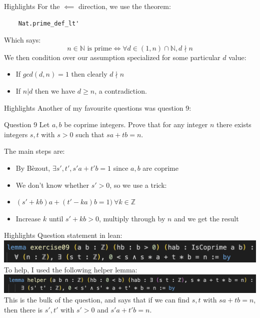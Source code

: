 \documentclass[presentation]{beamer}
\begin{document}
\begin{frame}[fragile]{Highlights}
    For the \(\impliedby\) direction, we use the theorem:
    \begin{verbatim}
    Nat.prime_def_lt'
    \end{verbatim}
    Which says:
    \[n \in \mathbb{N} \text{ is prime} \iff \forall d \in (1, n) \cap \mathbb{N}, d \nmid n\]
    \pause
    We then condition over our assumption specialized for some particular \(d\) value:
    \begin{itemize}
        \item If \(gcd(d, n) = 1\) then clearly \(d \nmid n\)
        \item If \(n \vert d\) then we have \(d \geq n \), a contradiction.
    \end{itemize}
    
\end{frame}


\begin{frame}{Highlights}
    Another of my favourite questions was question 9:
    \begin{block}{Question 9}
        Let \(a, b\) be coprime integers. Prove that for any integer \(n\) there exists integers \(s, t\) with \(s > 0\) such that \(sa + tb = n\).
    \end{block}
    \pause
    The main steps are:
    \begin{itemize}
        \item By Bèzout, \( \exists s', t', s'a + t'b = 1\) since \(a, b\) are coprime
        \pause
        \item We don't know whether \( s' > 0 \), so we use a trick:
        \pause
        \item \((s' + kb)a + (t' - ka)b = 1) \ \forall k \in \mathbb{Z}\)
        \pause
        \item Increase \( k \) until \(s' + kb > 0\), multiply through by \(n\) and we get the result
    \end{itemize}

\end{frame}

\begin{frame}{Highlights}
    Question statement in lean:
    \includegraphics[width=\textwidth]{UROP presentation/Question9.png}
    \pause
    To help, I used the following helper lemma:
    \includegraphics[width=\textwidth]{UROP presentation/Question9helper.png}
    This is the bulk of the question, and says that if we can find \(s, t\) with \(sa + tb = n\), then there is \(s', t'\) with \(s' > 0\) and \(s'a + t'b = n\).
\end{frame}
\end{document}

